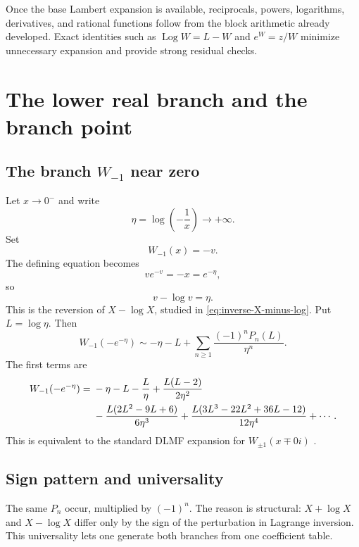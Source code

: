 \documentclass[11pt,openany]{book}
\theoremstyle{definition}
\theoremstyle{plain}
\theoremstyle{remark}
\DeclareMathOperator{\Log}{Log}
\begin{document}
\begin{summarybox}
Once the base Lambert expansion is available, reciprocals, powers, logarithms, derivatives, and rational functions follow from the block arithmetic already developed. Exact identities such as \(\Log W=L-W\) and \(e^W=z/W\) minimize unnecessary expansion and provide strong residual checks.
\end{summarybox}

\chapter{The lower real branch and the branch point}\label{ch:W-other-regimes}

\section{The branch \texorpdfstring{\(W_{-1}\)}{W-1} near zero}
Let \(x\to0^-\) and write
\begin{equation}\label{eq:eta-def}
 \eta=\log\left(-\frac1x\right)\to+\infty.
\end{equation}
Set
\[
 W_{-1}(x)=-v.
\]
The defining equation becomes
\[
 ve^{-v}=-x=e^{-\eta},
\]
so
\begin{equation}\label{eq:v-minus-logv}
 v-\log v=\eta.
\end{equation}
This is the reversion of \(X-\log X\), studied in \cref{eq:inverse-X-minus-log}. Put \(L=\log\eta\). Then
\begin{equation}\label{eq:Wminus1-Pn}
 W_{-1}(-e^{-\eta})
 \sim-\eta-L+
 \sum_{n\ge1}\frac{(-1)^nP_n(L)}{\eta^n}.
\end{equation}
The first terms are
\begin{align}
 W_{-1}(-e^{-\eta})={}&-\eta-L-\frac{L}{\eta}
 +\frac{L(L-2)}{2\eta^2}\notag\\
 &-\frac{L(2L^2-9L+6)}{6\eta^3}
 +\frac{L(3L^3-22L^2+36L-12)}{12\eta^4}
 +\cdots.
\label{eq:Wminus1-expanded}
\end{align}
This is equivalent to the standard DLMF expansion for \(W_{\pm1}(x\mp0i)\) \cite{dlmf-W}.

\section{Sign pattern and universality}
The same \(P_n\) occur, multiplied by \((-1)^n\). The reason is structural: \(X+\log X\) and \(X-\log X\) differ only by the sign of the perturbation in Lagrange inversion. This universality lets one generate both branches from one coefficient table.
\end{document}

